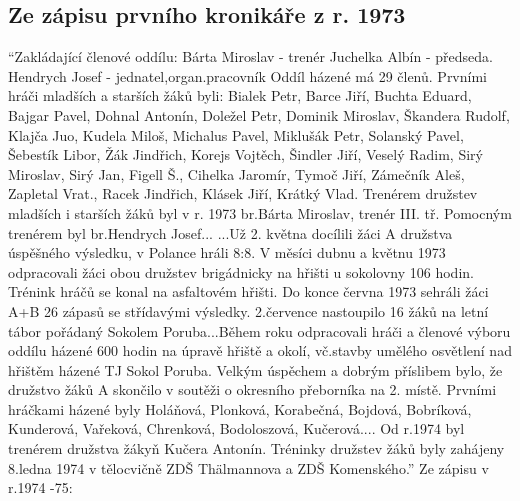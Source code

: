 \documentclass[openany]{report}
\begin{document}
\subsection{Ze zápisu prvního kronikáře z r. 1973}
\enquote{Zakládající členové oddílu:
Bárta Miroslav - trenér Juchelka Albín - předseda. Hendrych Josef - jednatel,organ.pracovník
Oddíl házené má 29 členů. Prvními hráči mladších a starších žáků byli: Bialek Petr, Barce Jiří, Buchta Eduard, Bajgar Pavel, Dohnal Antonín, Doležel Petr, Dominik Miroslav, Škandera Rudolf, Klajča Juo, Kudela Miloš, Michalus Pavel, Miklušák Petr, Solanský Pavel, Šebestík Libor, Žák Jindřich, Korejs Vojtěch, Šindler Jiří, Veselý Radim, Sirý Miroslav, Sirý Jan, Figell Š., Cihelka Jaromír, Tymoč Jiří, Zámečník Aleš, Zapletal Vrat., Racek Jindřich, Klásek Jiří, Krátký Vlad. Trenérem družstev mladších i starších žáků byl v r. 1973 br.Bárta Miroslav, trenér III. tř. Pomocným trenérem byl br.Hendrych Josef...
...Už 2. května docílili žáci A družstva úspěšného výsledku, v Polance hráli 8:8. V měsíci dubnu a květnu 1973 odpracovali žáci obou družstev brigádnicky na hřišti u sokolovny 106 hodin. Trénink hráčů se konal na asfaltovém hřišti. Do konce června 1973 sehráli žáci A+B 26 zápasů se střídavými výsledky. 2.července nastoupilo 16 žáků na letní tábor pořádaný Sokolem Poruba...Během roku odpracovali hráči a členové výboru oddílu házené 600 hodin na úpravě hřiště a okolí, vč.stavby umělého osvětlení nad hřištěm házené TJ Sokol Poruba. Velkým úspěchem a dobrým příslibem bylo, že družstvo žáků A skončilo v soutěži o okresního přeborníka na 2. místě. Prvními hráčkami házené byly Holáňová, Plonková, Korabečná, Bojdová, Bobríková, Kunderová, Vařeková, Chrenková, Bodoloszová, Kučerová.... Od r.1974 byl trenérem družstva žákyň Kučera Antonín. Tréninky družstev žáků byly zahájeny 8.ledna 1974 v tělocvičně ZDŠ Thälmannova a ZDŠ Komenského.}
Ze zápisu v r.1974 -75:
\end{document}
